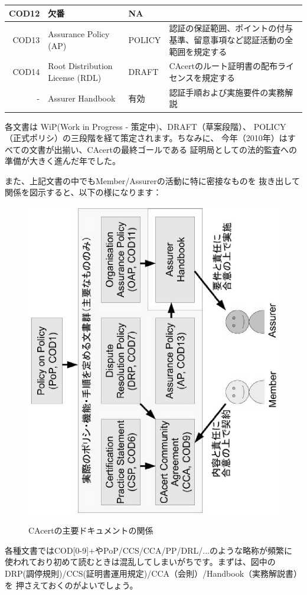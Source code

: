 \documentclass[mingoth,a4paper]{jsarticle}
\begin{document}
\begin{table}[H]
\begin{center}
\begin{tabular}{|r|p{10em}|l|p{20em}|}
COD12 &
欠番 & NA & \\ \hline

COD13 &
Assurance Policy (AP) & POLICY &
認証の保証範囲、ポイントの付与基準、留意事項など認証活動の全範囲を規定する \\ \hline

COD14 &
Root Distribution License (RDL) & DRAFT &
CAcertのルート証明書の配布ライセンスを規定する \\ \hline

- &
Assurer Handbook & 有効 &
認証手順および実施要件の実務解説 \\ \hline
\end{tabular}
\end{center}
\end{table}

各文書は WiP(Work in Progress - 策定中)、DRAFT（草案段階）、
POLICY（正式ポリシ）の三段階を経て策定されます。ちなみに、
今年（2010年）はすべての文書が出揃い、CAcertの最終ゴールである
証明局としての法的監査への準備が大きく進んだ年でした。

また、上記文書の中でもMember/Assurerの活動に特に密接なものを
抜き出して関係を図示すると、以下の様になります：

\begin{figure}[H]
\begin{center}
\includegraphics[width=0.6\hsize,angle=270]{image201012/cacertdocs.eps}
\label{fig:cacertdocs}
\end{center}
\caption{CAcertの主要ドキュメントの関係}
\end{figure}

各種文書ではCOD[0-9]+やPoP/CCS/CCA/PP/DRL/...のような略称が頻繁に
使われており初めて読むときは混乱してしまいがちです。まずは、図中の
DRP(調停規則)/CCS(証明書運用規定)/CCA（会則）/Handbook（実務解説書）を
押さえておくのがよいでしょう。
\end{document}

